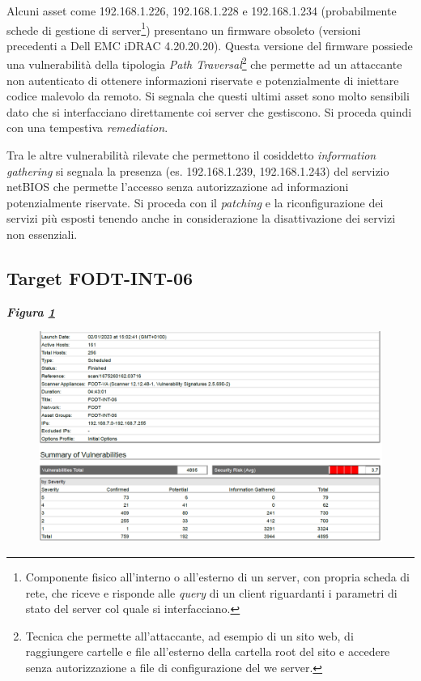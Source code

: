 \documentclass[target=bach,aauheader=]{thud}
\begin{document}
Alcuni asset come 192.168.1.226, 192.168.1.228 e 192.168.1.234 (probabilmente schede di gestione di server\footnote{Componente fisico all'interno o all'esterno di un server, con propria scheda di rete, che riceve e risponde alle \textit{query} di un client riguardanti i parametri di stato del server col quale si interfacciano.}) presentano un firmware obsoleto (versioni precedenti a Dell EMC iDRAC 4.20.20.20). Questa versione del firmware possiede una vulnerabilità della tipologia \textit{Path Traversal}\footnote{Tecnica che permette all'attaccante, ad esempio di un sito web, di raggiungere cartelle e file all'esterno della cartella root del sito e accedere senza autorizzazione a file di configurazione del we server.} che permette ad un attaccante non autenticato di ottenere informazioni riservate e potenzialmente di iniettare codice malevolo da remoto.
Si segnala che questi ultimi asset sono molto sensibili dato che si interfacciano direttamente coi server che gestiscono. Si proceda quindi con una tempestiva \textit{remediation}.

Tra le altre vulnerabilità rilevate che permettono il cosiddetto \textit{information gathering} si segnala la presenza (es. 192.168.1.239, 192.168.1.243) del servizio netBIOS che permette l’accesso senza autorizzazione ad informazioni potenzialmente riservate.
Si proceda con il \textit{patching} e la riconfigurazione dei servizi più esposti tenendo anche in considerazione la disattivazione dei servizi non essenziali.


\subsection{Target FODT-INT-06} \label{fodt-int-06} \textbf{\textit{Figura \ref{fig:fodt-int-06_1}}}

\begin{figure}[t]
    \centering
    \includegraphics[width=1\linewidth]{images/FODT-INT-06_1.png}
    \caption{}
    \label{fig:fodt-int-06_1}
\end{figure}
\end{document}
